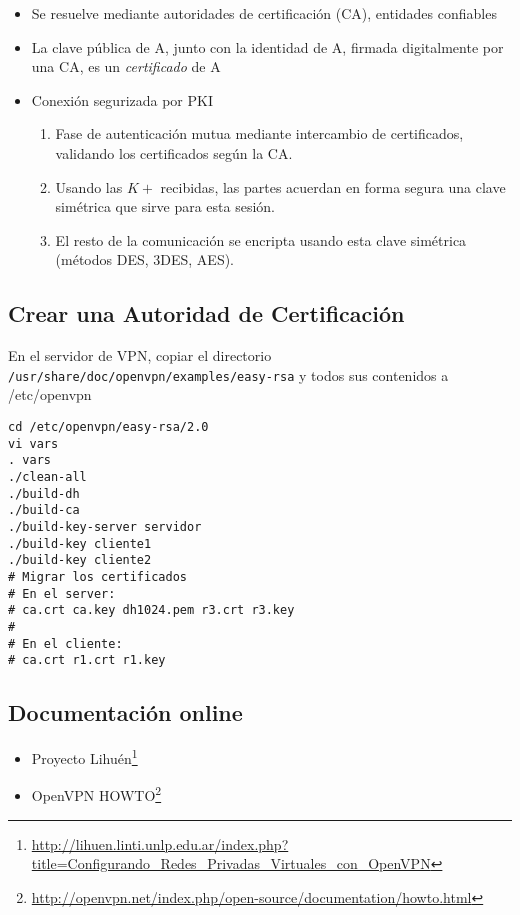 \begin{itemize}
	\item Se resuelve mediante autoridades de certificación (CA), entidades confiables
	\item La clave pública de A, junto con la identidad de A, firmada digitalmente por una CA, es un \emph{certificado} de A
	\item Conexión segurizada por PKI
	\begin{enumerate}
		\item Fase de autenticación mutua mediante intercambio de certificados, validando los certificados según la CA.
		\item Usando las $K+$ recibidas, las partes acuerdan en forma segura una clave simétrica que sirve para esta sesión.
		\item El resto de la comunicación se encripta usando esta clave simétrica (métodos DES, 3DES, AES).
	\end{enumerate} 
\end{itemize}


\subsection{Crear una Autoridad de Certificación}

En el servidor de VPN, copiar el directorio \lstinline{/usr/share/doc/openvpn/examples/easy-rsa} y todos sus contenidos a /etc/openvpn
\begin{lstlisting}
cd /etc/openvpn/easy-rsa/2.0
vi vars
. vars
./clean-all
./build-dh
./build-ca
./build-key-server servidor
./build-key cliente1
./build-key cliente2
# Migrar los certificados
# En el server:
# ca.crt ca.key dh1024.pem r3.crt r3.key
# 
# En el cliente:
# ca.crt r1.crt r1.key
\end{lstlisting}


\subsection{Documentación online}
\begin{itemize}
	\item Proyecto Lihuén\footnote{\url{http://lihuen.linti.unlp.edu.ar/index.php?title=Configurando_Redes_Privadas_Virtuales_con_OpenVPN}}
	\item OpenVPN HOWTO\footnote{\url{http://openvpn.net/index.php/open-source/documentation/howto.html}}
\end{itemize}


